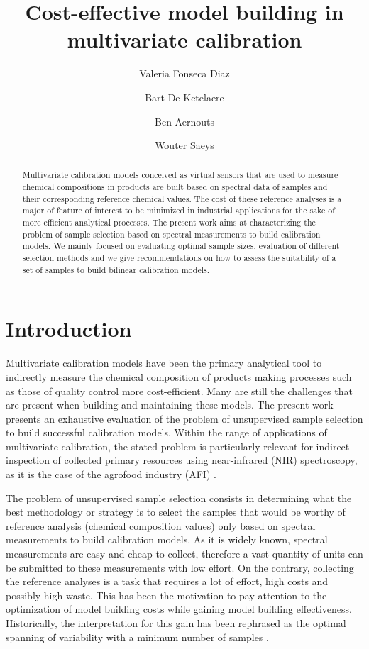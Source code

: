 \documentclass[journal=ancham,manuscript=article]{achemso}
\author{Valeria Fonseca Diaz}
\author{Bart De Ketelaere}
\author{Ben Aernouts}
\author{Wouter Saeys}
\affiliation[KU Leuven]
{KU Leuven, Kasteelpark
Arenberg 30, Leuven, Belgium}
\title[An \textsf{achemso} demo]
  {Cost-effective model building in multivariate calibration}
\begin{document}
\begin{abstract}
Multivariate calibration models conceived as virtual sensors that are used to measure chemical compositions in products are built based on spectral data of samples and their corresponding reference chemical values. The cost of these reference analyses is a major of feature of interest to be minimized in industrial applications for the sake of more efficient analytical processes. The present work aims at characterizing the problem of sample selection based on spectral measurements to build calibration models. We mainly focused on evaluating optimal sample sizes, evaluation of different selection methods and we give recommendations on how to assess the suitability of a set of samples to build bilinear calibration models.
\end{abstract}%


\section{Introduction}\label{introduction}

Multivariate calibration models have been the primary analytical tool to indirectly measure the chemical composition of products making processes such as those of quality control more cost-efficient. Many are still the challenges that are present when building and maintaining these models. The present work presents an exhaustive evaluation of the problem of unsupervised sample selection to build successful calibration models. Within the range of applications of multivariate calibration, the stated problem is particularly relevant for indirect inspection of collected primary resources using near-infrared (NIR) spectroscopy, as it is the case of the agrofood industry (AFI) \cite{Au2020,Diaz-Olivares2020, Saeys2005, Bobelyn2010}.  

The problem of unsupervised sample selection consists in determining what the best methodology or strategy is to select the samples that would be worthy of reference analysis (chemical composition values) only based on spectral measurements to build calibration models. As it is widely known, spectral measurements are easy and cheap to collect, therefore a vast quantity of units can be submitted to these measurements with low effort. On the contrary, collecting the reference analyses is a task that requires a lot of effort, high costs and possibly high waste. This has been the motivation to pay attention to the optimization of model building costs while gaining model building effectiveness. Historically, the interpretation for this gain has been rephrased as the optimal spanning of variability with a minimum number of samples \cite{Naes1990, Saeys2019,Kennard1969}.
\end{document}
